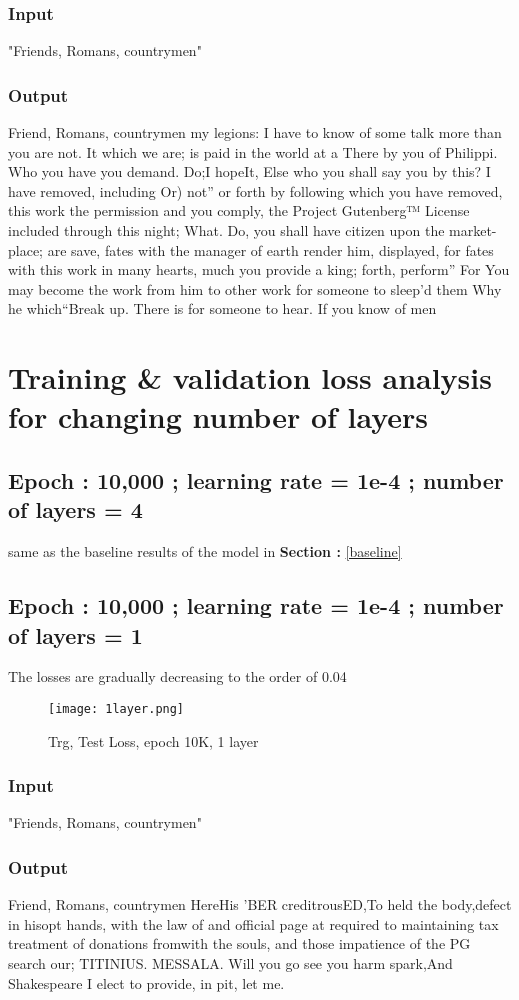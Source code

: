 \documentclass[conference]{IEEEtran}
\begin{document}
\subsubsection{Input}
"Friends, Romans, countrymen"
\subsubsection{Output}
Friend, Romans, countrymen my legions:
I have to know of some talk more than you are not.
It which we are; is paid in the world at a
There by you of Philippi.
Who you have you demand.
Do;I hopeIt, Else who you shall say you by this? I have removed, including Or) not” or forth by following which you have removed, this work the permission and you comply, the Project Gutenberg™ License included through this night; What. Do, you shall have citizen upon the market-place; are save, fates with the manager of earth render him, displayed, for fates with this work in many hearts, much you provide a king; forth, perform” For You may become the work from him to other work for someone to sleep’d them
Why he which“Break up. There is for someone to hear. If you know of men

\section{Training \& validation loss analysis for changing number of layers}
\subsection{Epoch : 10,000 ; learning rate = 1e-4 ; number of layers = 4}
same as the baseline results of the model in \textbf{Section :} \ref{baseline}

\subsection{Epoch : 10,000 ; learning rate = 1e-4 ; number of layers = 1}
The losses are gradually decreasing to the order of 0.04
\begin{figure}[H]
    \centering
    \texttt{[image: 1layer.png]}
    \caption{Trg, Test Loss, epoch 10K, 1 layer}
    \label{fig:epoch}
\end{figure}
\subsubsection{Input}
"Friends, Romans, countrymen"
\subsubsection{Output}
Friend, Romans, countrymen
HereHis ’BER creditrousED,To held the body,defect in hisopt hands,
with the law of and official page at required to maintaining tax treatment of donations fromwith the souls, and those impatience of the PG search our;  TITINIUS. MESSALA. Will you go see you harm spark,And Shakespeare I elect to provide, in pit, let me.
\end{document}
